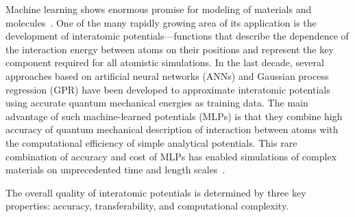 \documentclass[aps,prl,reprint,amsmath,amssymb,nature]{revtex4-1}
\begin{document}
Machine learning shows enormous promise for modeling of materials and molecules~\cite{ceriotti-science}. 
One of the many rapidly growing area of its application is the development of interatomic potentials---functions that describe the dependence of the interaction energy between atoms on their positions and represent the key component required for all atomistic simulations. 
In the last decade, several approaches based on artificial neural networks (ANNs) and Gaussian process regression (GPR) have been 
developed to approximate interatomic potentials using accurate quantum mechanical energies as training data. 
The main advantage of such machine-learned potentials (MLPs) is that they combine high accuracy of quantum mechanical description of interaction between atoms with the computational efficiency of simple analytical potentials. 
This rare combination of accuracy and cost of MLPs has enabled simulations of complex materials on unprecedented time and length scales~\cite{Khaliullin2010,Khaliullin2011,RZK0}. 

The overall quality of interatomic potentials is determined by three key properties: accuracy, transferability, and computational complexity.

\end{document}
